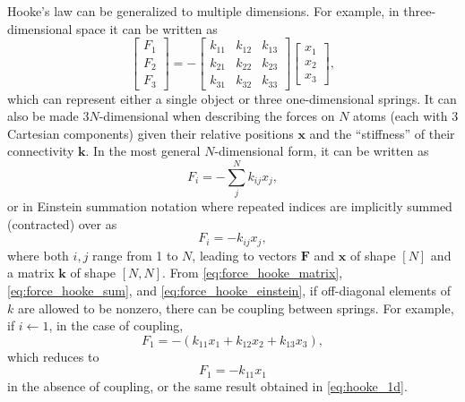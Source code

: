 \documentclass[%
class = book,%
crop = false,%
float = true,%
multi = true,%
preview = false,%
]{standalone}
\begin{document}
Hooke's law can be generalized to multiple dimensions. For example, in three-dimensional space it can be written as
\begin{equation}
  \label{eq:force_hooke_matrix}
  \begin{bmatrix}
    F_{1} \\ F_{2} \\ F_{3}
  \end{bmatrix}
  = -
  \begin{bmatrix}
    k_{11} & k_{12} & k_{13} \\
    k_{21} & k_{22} & k_{23} \\
    k_{31} & k_{32} & k_{33}
  \end{bmatrix}
  \begin{bmatrix}
    x_{1} \\ x_{2} \\ x_{3}
  \end{bmatrix},
\end{equation}
which can represent either a single object or three one-dimensional springs. It can also be made \(3N\)-dimensional when describing the forces on \(N\) atoms (each with 3 Cartesian components) given their relative positions \(\mathbf{x}\) and the ``stiffness'' of their connectivity \(\mathbf{k}\). In the most general \(N\)-dimensional form, it can be written as
\begin{equation}
  \label{eq:force_hooke_sum}
  F_{i} = - \sum_{j}^{N} k_{ij} x_{j},
\end{equation}
or in Einstein summation notation where repeated indices are implicitly summed (contracted) over as
\begin{equation}
  \label{eq:force_hooke_einstein}
  F_{i} = -k_{ij} x_{j},
\end{equation}
where both \(i,j\) range from 1 to \(N\), leading to vectors \(\mathbf{F}\) and \(\mathbf{x}\) of shape \([N]\) and a matrix \(\mathbf{k}\) of shape \([N,N]\). From \eqref{eq:force_hooke_matrix}, \eqref{eq:force_hooke_sum}, and \eqref{eq:force_hooke_einstein}, if off-diagonal elements of \(k\) are allowed to be nonzero, there can be coupling between springs. For example, if \(i \leftarrow 1\), in the case of coupling,
\begin{equation}
  \label{eq:force_hooke_example}
  F_{1} = -(k_{11}x_{1} + k_{12}x_{2} + k_{13}x_{3}),
\end{equation}
which reduces to
\begin{equation}
  \label{eq:force_hooke_example_nocoupling}
  F_{1} = -k_{11}x_{1}
\end{equation}
in the absence of coupling, or the same result obtained in \eqref{eq:hooke_1d}.
\end{document}
